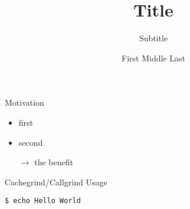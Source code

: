 \documentclass[xcolor={dvipsnames,table},compress]{beamer}
\title{Title}
\subtitle{Subtitle}
\author[Last]{First Middle Last}
\begin{document}
\begin{frame}
\titlepage
\end{frame}


\begin{frame}{Motivation}
\begin{itemize}
\item first
\item second
\item[$\rightarrow$] the benefit
\end{itemize}
\end{frame}


\begin{frame}[fragile]{Cachegrind/Callgrind Usage}
  \begin{verbatim}
$ echo Hello World
\end{verbatim}
\end{frame}

\end{document}
